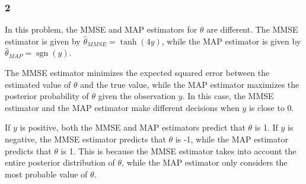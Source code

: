 \subsubsection{2}

In this problem, the MMSE and MAP estimators for $\theta$ are different. The MMSE estimator is given by $\hat{\theta}_{MMSE} = \tanh(4y)$, while the MAP estimator is given by $\hat{\theta}_{MAP} = \operatorname{sgn}(y)$.

The MMSE estimator minimizes the expected squared error between the estimated value of $\theta$ and the true value, while the MAP estimator maximizes the posterior probability of $\theta$ given the observation $y$. In this case, the MMSE estimator and the MAP estimator make different decisions when $y$ is close to 0.

If $y$ is positive, both the MMSE and MAP estimators predict that $\theta$ is 1. If $y$ is negative, the MMSE estimator predicts that $\theta$ is -1, while the MAP estimator predicts that $\theta$ is 1. This is because the MMSE estimator takes into account the entire posterior distribution of $\theta$, while the MAP estimator only considers the most probable value of $\theta$.


